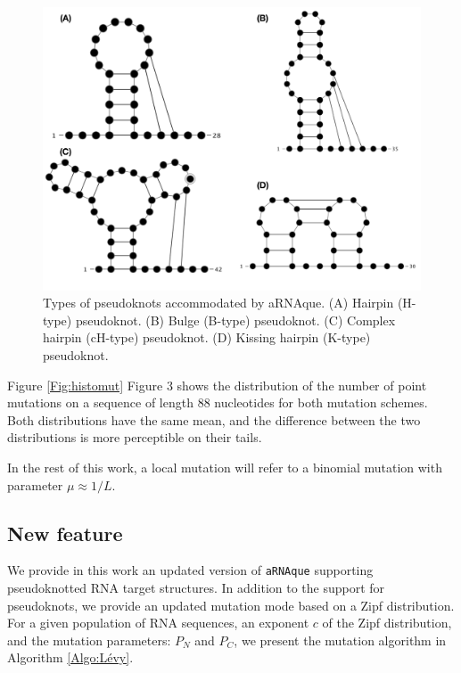 \begin{figure}[t!]
	\centering
	\includegraphics[width=1.0 \linewidth]{../res/images/arnaque/pk_type.pdf}
	\caption{Types of pseudoknots accommodated by aRNAque. (A) Hairpin (H-type) pseudoknot. (B) Bulge (B-type) pseudoknot. (C) Complex hairpin (cH-type) pseudoknot. (D) Kissing hairpin  (K-type) pseudoknot.\label{Fig:pk_type}}
	
\end{figure}
Figure \ref{Fig:histomut} Figure 3 shows the distribution of the number of point mutations on a sequence of length $88$ nucleotides for both mutation schemes. Both distributions have the same mean, and the difference between the two distributions is more perceptible on their tails. 

In the rest of this work, a local mutation will refer to a binomial mutation with parameter $\mu \approx 1/L$.


\subsection*{New feature}
We provide in this work an updated version of \texttt{aRNAque} supporting pseudoknotted RNA target structures. In addition to the  support for pseudoknots, we provide an updated mutation mode based on a Zipf distribution. For a given population of RNA sequences, an exponent $c$ of the Zipf distribution, and the mutation parameters: $P_N$ and $P_C$, we present the mutation algorithm in Algorithm \ref{Algo:Lévy}.


